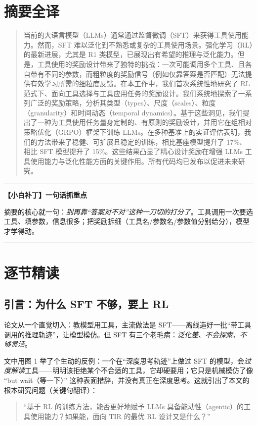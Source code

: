 \documentclass[11pt,UTF8,fontset=fandol]{ctexart}
\newenvironment{tip}[1]{%
  \par\smallskip\noindent\rule{\linewidth}{0.4pt}\par\nobreak
  \noindent\textbf{【小白补丁】#1}\par\nobreak\noindent\ignorespaces
}{%
  \par\noindent\rule{\linewidth}{0.4pt}\par\smallskip
}
\begin{document}
\section{摘要全译}

\begin{quote}\small
当前的大语言模型（LLMs）通常通过监督微调（SFT）来获得工具使用能力。然而，SFT 难以泛化到不熟悉或复杂的工具使用场景。强化学习（RL）的最新进展，尤其是 R1 类模型，已展现出有希望的推理与泛化能力。但是，工具使用的奖励设计带来了独特的挑战：一次可能调用多个工具、且各自带有不同的参数，而粗粒度的奖励信号（例如仅靠答案是否匹配）无法提供有效学习所需的细粒度反馈。在本工作中，我们首次系统性地研究了 RL 范式下、面向工具选择与工具应用任务的奖励设计。我们系统地探索了一系列广泛的奖励策略，分析其类型（types）、尺度（scales）、粒度（granularity）和时间动态（temporal dynamics）。基于这些洞见，我们提出了一种为工具使用任务量身定制的、有原则的奖励设计，并用它在组相对策略优化（GRPO）框架下训练 LLMs。在多种基准上的实证评估表明，我们的方法带来了稳健、可扩展且稳定的训练，相比基座模型提升了 17\%、相比 SFT 模型提升了 15\%。这些结果凸显了精心设计奖励在增强 LLMs 工具使用能力与泛化性能方面的关键作用。所有代码均已发布以促进未来研究。
\end{quote}

\begin{tip}{一句话抓重点}
摘要的核心就一句：\emph{别再靠“答案对不对”这种一刀切的打分了}。工具调用一次要选工具、填参数，信息很多；把奖励拆细（工具名/参数名/参数值分别给分），模型才学得动。
\end{tip}

\section{逐节精读}

\subsection{引言：为什么 SFT 不够，要上 RL}

论文从一个直觉切入：教模型用工具，主流做法是 SFT——离线造好一批“带工具调用的推理轨迹”，让模型模仿。但 SFT 有三个老毛病：\emph{泛化差、不会探索、不够灵活}。

文中用图 1 举了个生动的反例：一个在“深度思考轨迹”上做过 SFT 的模型，会\emph{过度解读}工具——明明该拒绝某个不合适的工具，它却硬要用；它只是机械模仿了像 “but wait（等一下）” 这种表面措辞，并没有真正在深度思考。这就引出了本文的根本研究问题（关键句翻译）：

\begin{quote}\small
“基于 RL 的训练方法，能否更好地赋予 LLMs 具备能动性（agentic）的工具使用能力？如果能，面向 TIR 的最优 RL 设计又是什么？”
\end{quote}
\end{document}
